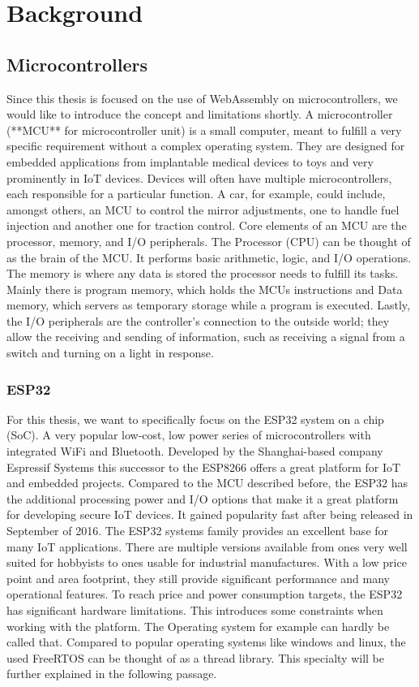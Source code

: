 
\chapter{Background}\label{chapter:background}

\section{Microcontrollers}
Since this thesis is focused on the use of WebAssembly on microcontrollers, we would like to introduce the concept and limitations shortly. A microcontroller (**MCU** for microcontroller unit) is a small computer, meant to fulfill a very specific requirement without a complex operating system. They are designed for embedded applications from implantable medical devices to toys and very prominently in IoT devices. Devices will often have multiple microcontrollers, each responsible for a particular function. A car, for example, could include, amongst others, an MCU to control the mirror adjustments, one to handle fuel injection and another one for traction control.
Core elements of an MCU are the processor, memory, and I/O peripherals. The Processor (CPU) can be thought of as the brain of the MCU. It performs basic arithmetic, logic, and I/O operations. The memory is where any data is stored the processor needs to fulfill its tasks. Mainly there is program memory, which holds the MCUs instructions and Data memory, which servers as temporary storage while a program is executed. Lastly, the I/O peripherals are the controller's connection to the outside world; they allow the receiving and sending of information, such as receiving a signal from a switch and turning on a light in response.
\subsection{ESP32}
For this thesis, we want to specifically focus on the ESP32 system on a chip (SoC). A very popular low-cost, low power series of microcontrollers with integrated WiFi and Bluetooth. Developed by the Shanghai-based company Espressif Systems this successor to the ESP8266 offers a great platform for IoT and embedded projects. Compared to the MCU described before, the ESP32 has the additional processing power and I/O options that make it a great platform for developing secure IoT devices. It gained popularity fast after being released in September of 2016.
The ESP32 systems family provides an excellent base for many IoT applications. There are multiple versions available from ones very well suited for hobbyists to ones usable for industrial manufactures. With a low price point and area footprint, they still provide significant performance and many operational features.
To reach price and power consumption targets, the ESP32 has significant hardware limitations. This introduces some constraints when working with the platform. The Operating system for example can hardly be called that. Compared to popular operating systems like windows and linux, the used FreeRTOS can be thought of as a thread library. This specialty will be further explained in the following passage.
